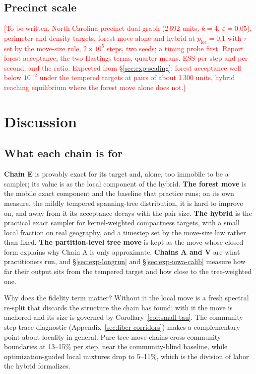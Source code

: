\documentclass[11pt]{article}
\newcommand{\todo}[1]{\textcolor{red}{[#1]}}
\begin{document}
\subsection{Precinct scale}\label{sec:exp-precinct}

\todo{To be written. North Carolina precinct dual graph (2\,692 units,
$k = 4$, $\varepsilon = 0.05$), perimeter and density targets, forest
move alone and hybrid at $p_{\mathrm{loc}} = 0.1$ with $\tau$ set by
the move-size rule, $2 \times 10^5$ steps, two seeds; a timing probe
first. Report forest acceptance, the two Hastings terms, quarter means,
ESS per step and per second, and the ratio. Expected from
\S\ref{sec:exp-scaling}: forest acceptance well below $10^{-2}$ under
the tempered targets at pairs of about 1\,300 units, hybrid reaching
equilibrium where the forest move alone does not.}

\section{Discussion}\label{sec:discussion}

\subsection{What each chain is for}\label{sec:disc-roles}

\textbf{Chain E} is provably exact for its target and, alone, too
immobile to be a sampler; its value is as the local component of the
hybrid. \textbf{The forest move} is the mobile exact component and
the baseline that practice runs; on its own measure, the mildly
tempered spanning-tree distribution, it is hard to improve on, and
away from it its acceptance decays with the pair size. \textbf{The
hybrid} is the practical exact sampler for kernel-weighted
compactness targets, with a small local fraction on real geography,
and a timestep set by the move-size law rather than fixed.
\textbf{The partition-level tree move} is kept as the move whose
closed form explains why Chain A is only approximate.
\textbf{Chains A and V} are what practitioners run, and
\S\ref{sec:exp-longrun} and \S\ref{sec:exp-iowa-calib} measure how
far their output sits from the tempered target and how close to the
tree-weighted one.

Why does the fidelity term matter? Without it the local move is a
fresh spectral re-split that discards the structure the chain has
found; with it the move is anchored and its size is governed by
Corollary~\ref{cor:small-tau}. The community step-trace diagnostic
(Appendix~\ref{sec:fiber-corridors}) makes a complementary point
about locality in general. Pure tree-move chains cross community
boundaries at 13--15\% per step, near the community-blind baseline,
while optimization-guided local mixtures drop to 5--11\%, which is
the division of labor the hybrid formalizes.
\end{document}
